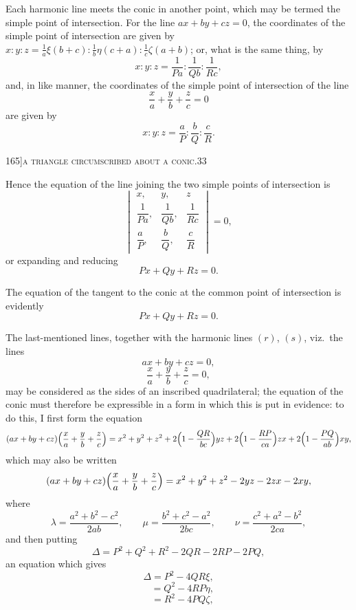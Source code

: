 \documentclass[11pt]{article}
\begin{document}
Each harmonic line meets the conic in another point, which may be termed the
simple point of intersection. For the line $ax + by + cz = 0$, the coordinates of the simple
point of intersection are given by $x : y : z = \tfrac{1}{a}\xi(b+c) : \tfrac{1}{b}\eta(c+a) : \tfrac{1}{c}\zeta(a+b)$; or, what
is the same thing, by
\[
x : y : z = \frac{1}{Pa} : \frac{1}{Qb} : \frac{1}{Rc},
\]
and, in like manner, the coordinates of the simple point of intersection of the line
\[
\frac{x}{a} + \frac{y}{b} + \frac{z}{c} = 0
\]
are given by
\[
x : y : z = \frac{a}{P} : \frac{b}{Q} : \frac{c}{R}.
\]

\newpage

\begin{center}
\small 165]\hfill\textsc{a triangle circumscribed about a conic.}\hfill\textsc{33}
\end{center}

\medskip

\noindent Hence the equation of the line joining the two simple points of intersection is
\[
\begin{vmatrix}
x, & y, & z \\[2pt]
\dfrac{1}{Pa}, & \dfrac{1}{Qb}, & \dfrac{1}{Rc} \\[6pt]
\dfrac{a}{P}, & \dfrac{b}{Q}, & \dfrac{c}{R}
\end{vmatrix} = 0,
\]
or expanding and reducing
\[
P x + Q y + R z = 0.
\]

The equation of the tangent to the conic at the common point of intersection is
evidently
\[
P x + Q y + R z = 0.
\]

The last-mentioned lines, together with the harmonic lines $(r)$, $(s)$, viz.\ the lines
\[
ax + by + cz = 0,
\]
\[
\frac{x}{a} + \frac{y}{b} + \frac{z}{c} = 0,
\]
may be considered as the sides of an inscribed quadrilateral; the equation of the conic
must therefore be expressible in a form in which this is put in evidence: to do this,
I first form the equation
\[
(ax + by + cz)\Bigl(\frac{x}{a} + \frac{y}{b} + \frac{z}{c}\Bigr) = x^{2} + y^{2} + z^{2}
+ 2\Bigl(1 - \frac{QR}{bc}\Bigr) yz
+ 2\Bigl(1 - \frac{RP}{ca}\Bigr) zx
+ 2\Bigl(1 - \frac{PQ}{ab}\Bigr) xy,
\]
which may also be written
\[
(ax + by + cz)\Bigl(\frac{x}{a} + \frac{y}{b} + \frac{z}{c}\Bigr) = x^{2} + y^{2} + z^{2} - 2yz - 2zx - 2xy,
\]
where
\[
\lambda = \frac{a^{2} + b^{2} - c^{2}}{2 a b},\qquad
\mu = \frac{b^{2} + c^{2} - a^{2}}{2 b c},\qquad
\nu = \frac{c^{2} + a^{2} - b^{2}}{2 c a},
\]
and then putting
\[
\Delta = P^{2} + Q^{2} + R^{2} - 2QR - 2RP - 2PQ,
\]
an equation which gives
\[
\Delta = P^{2} - 4Q R\xi,
\]
\[
\phantom{\Delta} = Q^{2} - 4R P\eta,
\]
\[
\phantom{\Delta} = R^{2} - 4P Q\zeta,
\]
\end{document}

